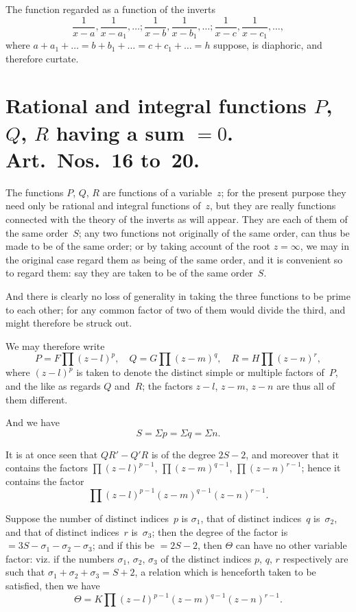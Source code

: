 \documentclass[11pt,a4paper]{book}
\begin{document}
\begin{art}
The function regarded as a function of the inverts
\[
\frac{1}{x-a}, \frac{1}{x-a_1}, \ldots; \frac{1}{x-b}, \frac{1}{x-b_1}, \ldots; \frac{1}{x-c}, \frac{1}{x-c_1}, \ldots,
\]
where $a + a_1 + \ldots = b + b_1 + \ldots = c + c_1 + \ldots = h$ suppose,
is diaphoric, and therefore curtate.
\end{art}


\section*{Rational and integral functions $P$, $Q$, $R$ having a sum $=0$.
Art.~Nos.~16 to~20.}

\begin{art}
The functions $P$, $Q$, $R$ are functions of a variable~$z$; for the present
purpose they need only be rational and integral functions of~$z$, but they
are really functions connected with the theory of the inverts as will
appear. They are each of them of the same order~$S$; any two functions
not originally of the same order, can thus be made to be of the same
order; or by taking account of the root $z = \infty$, we may in the original
case regard them as being of the same order, and it is convenient so to
regard them: say they are taken to be of the same order~$S$.

And there is clearly no loss of generality in taking the three functions
to be prime to each other; for any common factor of two of them would
divide the third, and might therefore be struck out.
\end{art}

\begin{art}
We may therefore write
\[
P = F \prod (z-l)^p, \quad Q = G \prod (z-m)^q, \quad R = H \prod (z-n)^r,
\]
where $(z-l)^p$ is taken to denote the distinct simple or multiple factors
of~$P$, and the like as regards $Q$ and~$R$; the factors $z-l$, $z-m$, $z-n$
are thus all of them different.

And we have
\[
S = \Sigma p = \Sigma q = \Sigma n.
\]
\end{art}

\begin{art}
It is at once seen that $QR' - Q'R$ is of the degree $2S-2$, and moreover
that it contains the factors $\prod (z-l)^{p-1}$, $\prod (z-m)^{q-1}$,
$\prod (z-n)^{r-1}$; hence it contains the factor
\[
\prod (z-l)^{p-1} (z-m)^{q-1} (z-n)^{r-1}.
\]

Suppose the number of distinct indices~$p$ is $\sigma_1$, that of distinct
indices~$q$ is~$\sigma_2$, and that of distinct indices~$r$ is~$\sigma_3$;
then the degree of the factor is $= 3S - \sigma_1 - \sigma_2 - \sigma_3$;
and if this be $= 2S - 2$, then $\Theta$ can have no other variable factor:
viz. if the numbers $\sigma_1$, $\sigma_2$, $\sigma_3$ of the distinct indices $p$, $q$, $r$
respectively are such that $\sigma_1 + \sigma_2 + \sigma_3 = S + 2$,
a relation which is henceforth taken to be satisfied, then we have
\[
\Theta = K \prod (z-l)^{p-1} (z-m)^{q-1} (z-n)^{r-1}.
\]
\end{art}
\end{document}
